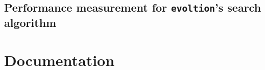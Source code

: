 \begin{appendices}
\section{Performance measurement for \texttt{evoltion}'s search algorithm}


\chapter{Documentation}

\end{appendices}